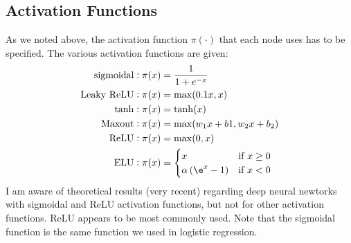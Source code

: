 \documentclass[10pt]{article}
\begin{document}
\subsection{Activation Functions}

As we noted above, the activation function \(\pi(\cdot)\) that each node uses has to be specified. The various activation functions are given:
\begin{align*}
	\text{sigmoidal}: \pi(x) &= \frac{1}{1 + e^{-x}}\\
	\text{Leaky ReLU}: \pi(x) &= \max(0.1x,x) \\
	\tanh: \pi(x) &= \tanh(x) \\
	\text{Maxout}: \pi(x) &= \max(w_1x + b1, w_2x+b_2) \\
	\text{ReLU}: \pi(x) &= \max(0,x)\\
	\text{ELU}: \pi(x) &= \begin{cases}
		x & \text{if }x\geq 0 \\
		\alpha\left(\e^x-1\right)&\text{if }x<0
	\end{cases}	
\end{align*}
I am aware of theoretical results (very recent) regarding deep neural newtorks with sigmoidal and ReLU activation functions, but not for other activation functions. ReLU appears to be most commonly used. Note that the sigmoidal function is the same function we used in logistic regression.
\end{document}
